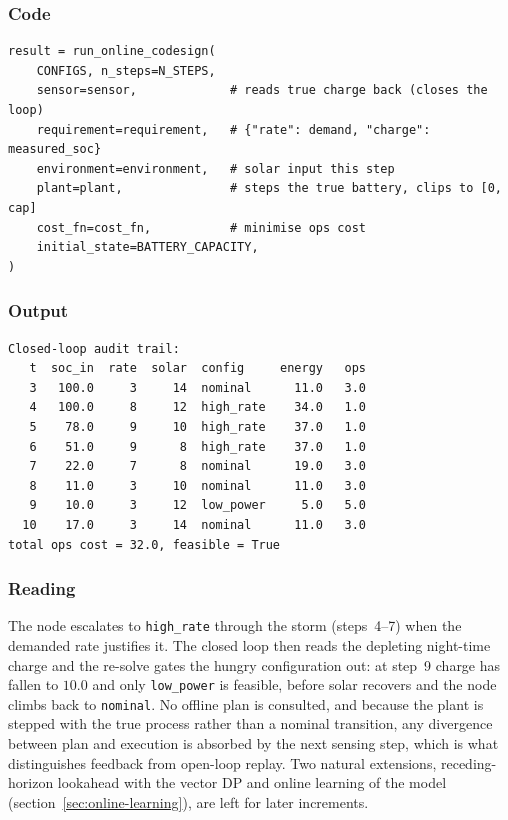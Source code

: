 \documentclass[11pt,a4paper]{article}
\begin{document}
\subsubsection*{Code}
\begin{lstlisting}
result = run_online_codesign(
    CONFIGS, n_steps=N_STEPS,
    sensor=sensor,             # reads true charge back (closes the loop)
    requirement=requirement,   # {"rate": demand, "charge": measured_soc}
    environment=environment,   # solar input this step
    plant=plant,               # steps the true battery, clips to [0, cap]
    cost_fn=cost_fn,           # minimise ops cost
    initial_state=BATTERY_CAPACITY,
)
\end{lstlisting}

\subsubsection*{Output}
\begin{lstlisting}[language={},numbers=none,keywordstyle={}]
Closed-loop audit trail:
   t  soc_in  rate  solar  config     energy   ops
   3   100.0     3     14  nominal      11.0   3.0
   4   100.0     8     12  high_rate    34.0   1.0
   5    78.0     9     10  high_rate    37.0   1.0
   6    51.0     9      8  high_rate    37.0   1.0
   7    22.0     7      8  nominal      19.0   3.0
   8    11.0     3     10  nominal      11.0   3.0
   9    10.0     3     12  low_power     5.0   5.0
  10    17.0     3     14  nominal      11.0   3.0
total ops cost = 32.0, feasible = True
\end{lstlisting}

\subsubsection*{Reading}
The node escalates to \texttt{high\_rate} through the storm (steps~4--7)
when the demanded rate justifies it. The closed loop then reads the
depleting night-time charge and the re-solve gates the hungry
configuration out: at step~9 charge has fallen to $10.0$ and only
\texttt{low\_power} is feasible, before solar recovers and the node climbs
back to \texttt{nominal}. No offline plan is consulted, and because the
plant is stepped with the true process rather than a nominal transition,
any divergence between plan and execution is absorbed by the next sensing
step, which is what distinguishes feedback from open-loop replay. Two
natural extensions, receding-horizon lookahead with the vector DP and
online learning of the model (section~\ref{sec:online-learning}), are left
for later increments.
\end{document}
